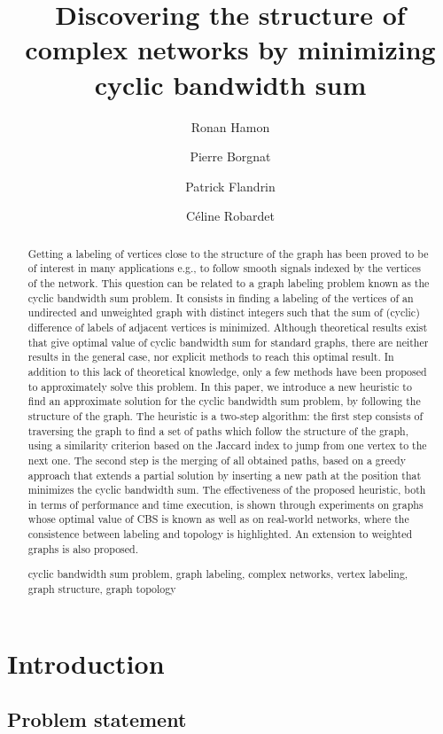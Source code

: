 \documentclass{scrartcl}
\title{Discovering the structure of complex networks by minimizing cyclic 
bandwidth sum}
\author{Ronan Hamon \and Pierre Borgnat \and Patrick Flandrin \and 
C\'eline Robardet}
\date{}
\theoremstyle{plain}
\begin{document}
\maketitle

\begin{abstract}
{Getting a labeling of vertices close to the structure of the graph has been 
proved to be of interest in many applications e.g., to follow smooth signals 
indexed by the vertices of the network. This question can be related to a graph 
labeling problem known as the cyclic bandwidth sum problem. It consists in 
finding a labeling of the vertices of an undirected and unweighted graph with 
distinct integers such that the sum of (cyclic) difference of labels of adjacent 
vertices is minimized. Although theoretical results exist that give optimal 
value of cyclic bandwidth sum for standard graphs, there are neither results in 
the general case, nor explicit methods to reach this optimal result. In addition 
to this lack of theoretical knowledge, only a few methods have been proposed to 
approximately solve this problem. In this paper, we introduce a new heuristic to 
find an approximate solution for the cyclic bandwidth sum problem, by following 
the structure of the graph. The heuristic is a two-step algorithm: the first 
step consists of traversing the graph to find a set of paths which follow the 
structure of the graph, using a similarity criterion based on the Jaccard index 
to jump from one vertex to the next one. The second step is the merging of all 
obtained paths, based on a greedy approach that extends a partial solution by 
inserting a new path at the position that minimizes the cyclic bandwidth sum. 
The effectiveness of the proposed heuristic, both in terms of performance and 
time execution, is shown through experiments on graphs whose optimal value of 
CBS is known as well as on real-world networks, where the consistence between 
labeling and topology is highlighted. An extension to weighted graphs is also 
proposed.}

{cyclic bandwidth sum problem, graph labeling, complex networks, vertex 
labeling, graph structure, graph topology}
		
\end{abstract}

\makeatletter{}\section{Introduction}
\label{sec:introduction}

\subsection{Problem statement}
\end{document}
